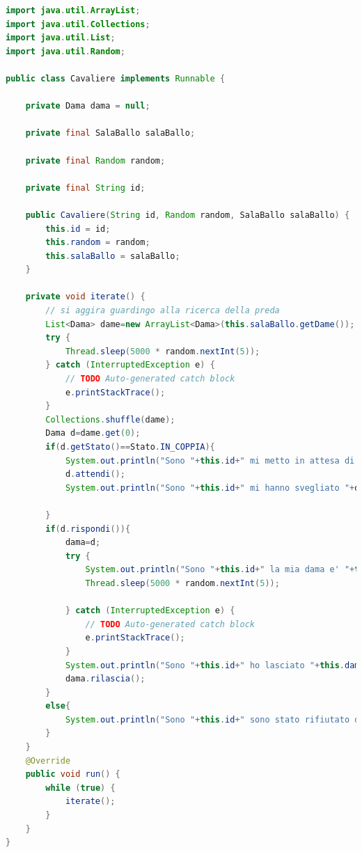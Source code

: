 \documentclass{article}
\begin{document}
\begin{lstlisting}[language=Java]
import java.util.ArrayList;
import java.util.Collections;
import java.util.List;
import java.util.Random;

public class Cavaliere implements Runnable {

	private Dama dama = null;

	private final SalaBallo salaBallo;

	private final Random random;

	private final String id;

	public Cavaliere(String id, Random random, SalaBallo salaBallo) {
		this.id = id;
		this.random = random;
		this.salaBallo = salaBallo;
	}

	private void iterate() {
		// si aggira guardingo alla ricerca della preda
		List<Dama> dame=new ArrayList<Dama>(this.salaBallo.getDame());
		try {
			Thread.sleep(5000 * random.nextInt(5));
		} catch (InterruptedException e) {
			// TODO Auto-generated catch block
			e.printStackTrace();
		}
		Collections.shuffle(dame);
		Dama d=dame.get(0);
		if(d.getStato()==Stato.IN_COPPIA){
			System.out.println("Sono "+this.id+" mi metto in attesa di "+d.getName());
			d.attendi();
			System.out.println("Sono "+this.id+" mi hanno svegliato "+d.getName()+" si e' lasciata");
			
		}
		if(d.rispondi()){
			dama=d;
			try {
				System.out.println("Sono "+this.id+" la mia dama e' "+this.dama.getName());
				Thread.sleep(5000 * random.nextInt(5));
				
			} catch (InterruptedException e) {
				// TODO Auto-generated catch block
				e.printStackTrace();
			}
			System.out.println("Sono "+this.id+" ho lasciato "+this.dama.getName());
			dama.rilascia();
		}
		else{
			System.out.println("Sono "+this.id+" sono stato rifiutato da "+d.getName());
		}
	}
	@Override
	public void run() {
		while (true) {
			iterate();
		}
	}
}
\end{lstlisting}
\end{document}
